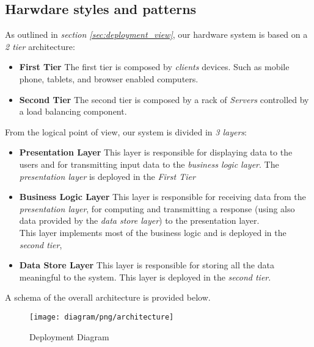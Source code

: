 \subsection{Harwdare styles and patterns} %
\label{sub:harwdare_styles_and_patterns}
As outlined in \emph{section \ref{sec:deployment_view}}, our hardware system is based on a \emph{2 tier} architecture:
\begin{itemize}
	\item \textbf{First Tier} The first tier is composed by \emph{clients} devices. Such as mobile phone, tablets, and browser enabled computers.
	\item \textbf{Second Tier} The second tier is composed by a rack of \emph{Servers} controlled by a load balancing component.
\end{itemize}
From the logical point of view, our system is divided in \emph{3 layers}:
\begin{itemize}
	\item \textbf{Presentation Layer} This layer is responsible for displaying data to the users and for transmitting input data to the \emph{business logic layer}. The \emph{presentation layer} is deployed in the \emph{First Tier}
	\item \textbf{Business Logic Layer} This layer is responsible for receiving data from the \emph{presentation layer}, for computing and transmitting a response (using also data provided by the \emph{data store layer}) to the presentation layer.\\
	This layer implements most of the business logic and is deployed in the \emph{second tier},
	\item \textbf{Data Store Layer} This layer is responsible for storing all the data meaningful to the system. This layer is deployed in the \emph{second tier}.
\end{itemize}
A schema of the overall architecture is provided below.
\begin{figure}[h!t]
\caption{Deployment Diagram}
\texttt{[image: diagram/png/architecture]}
\centering
\end{figure}
\newpage




